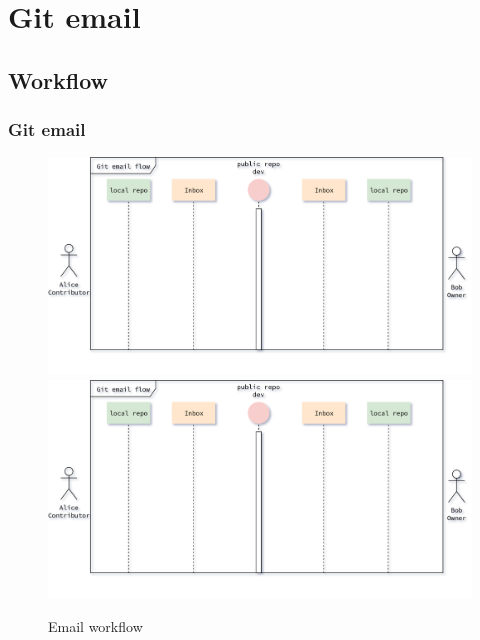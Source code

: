 \section{Git email}
\subsection{Workflow}
\begin{frame}
    \frametitle{Git email}
    \begin{figure}
        \begin{center}
            {
                \includegraphics[height=0.7\textheight,keepaspectratio]{./images/EmailWorkflow.png}
            }
            {
                \includegraphics[height=0.75\textheight,keepaspectratio]{./images/EmailWorkflow.png}
            }
            \caption{Email workflow}
        \end{center}
    \end{figure}
\end{frame}

